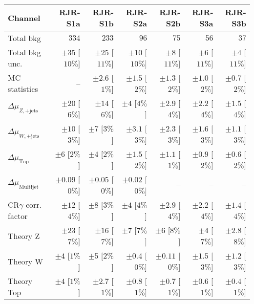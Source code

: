 
\begin{table}[tbp]
\scriptsize
\begin{center}
\begin{tabular}{|lrrrrrr|}
\hline
Channel  &  \textbf{ RJR-S1a } & \textbf{ RJR-S1b } & \textbf{ RJR-S2a } & \textbf{ RJR-S2b } & \textbf{ RJR-S3a } & \textbf{ RJR-S3b }  \\ \hline
Total bkg  &  $334$  &  $233$  &  $96$  &  $75$  &  $56$  &  $37$ \\
Total bkg unc.  &  $\pm 35$  [$10\%$]  &  $\pm 25$  [$11\%$]  &  $\pm 10$  [$10\%$]  &  $\pm 8$  [$11\%$]  &  $\pm 6$  [$11\%$]  &  $\pm 4$  [$11\%$] \\
\hline
MC statistics  &   --    &  $\pm 2.6$ [$1\%$]  &  $\pm 1.5$ [$2\%$]  &  $\pm 1.3$ [$2\%$]  &  $\pm 1.0$ [$2\%$]  &  $\pm 0.7$ [$2\%$] \\
$\Delta\mu_{Z,\mathrm{+jets}}$    &  $\pm 20$ [$6\%$]  &  $\pm 14$ [$6\%$]  &  $\pm 4$ [$4\%$]  &  $\pm 2.9$ [$4\%$]  &  $\pm 2.2$ [$4\%$]  &  $\pm 1.5$ [$4\%$] \\
$\Delta\mu_{W,\mathrm{+jets}}$    &  $\pm 10$ [$3\%$]  &  $\pm 7$ [$3\%$]  &  $\pm 3.1$ [$3\%$]  &  $\pm 2.3$ [$3\%$]  &  $\pm 1.6$ [$3\%$]  &  $\pm 1.1$ [$3\%$] \\
$\Delta\mu_{  \mathrm{ Top}}$       &  $\pm 6$ [$2\%$]  &  $\pm 4$ [$2\%$]  &  $\pm 1.5$ [$2\%$]  &  $\pm 1.1$ [$1\%$]  &  $\pm 0.9$ [$2\%$]  &  $\pm 0.6$ [$2\%$] \\
$\Delta\mu_{  \mathrm{ Multijet}}$  &  $\pm 0.09$ [$0\%$]  &  $\pm 0.05$ [$0\%$]  &  $\pm 0.02$ [$0\%$]  &   --    &   --    &   --   \\
CR$\gamma$ corr. factor  &  $\pm 12$ [$4\%$]  &  $\pm 8$ [$3\%$]  &  $\pm 4$ [$4\%$]  &  $\pm 2.9$ [$4\%$]  &  $\pm 2.2$ [$4\%$]  &  $\pm 1.4$ [$4\%$] \\
Theory Z  &  $\pm 23$ [$7\%$]  &  $\pm 16$ [$7\%$]  &  $\pm 7$ [$7\%$]  &  $\pm 6$ [$8\%$]  &  $\pm 4$ [$7\%$]  &  $\pm 2.8$ [$8\%$] \\
Theory W  &  $\pm 4$ [$1\%$]  &  $\pm 5$ [$2\%$]  &  $\pm 0.4$ [$0\%$]  &  $\pm 0.11$ [$0\%$]  &  $\pm 1.5$ [$3\%$]  &  $\pm 1.2$ [$3\%$] \\
Theory Top   &  $\pm 4$ [$1\%$]  &  $\pm 2.7$ [$1\%$]  &  $\pm 0.8$ [$1\%$]  &  $\pm 0.7$ [$1\%$]  &  $\pm 0.6$ [$1\%$]  &  $\pm 0.4$ [$1\%$] \\

\end{tabular}
\end{center}
\end{table}
